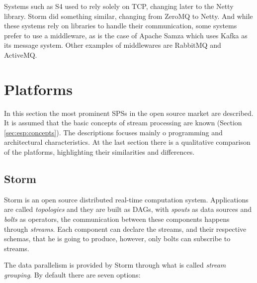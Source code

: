\documentclass[ppgc,diss,english]{iiufrgs}
\begin{document}
Systems such as S4 used to rely solely on TCP, changing later to the Netty library. Storm did something similar, changing from ZeroMQ to Netty. And while these systems rely on libraries to handle their communication, some systems prefer to use a middleware, as is the case of Apache Samza which uses Kafka as its message system. Other examples of middlewares are RabbitMQ and ActiveMQ.


\section{Platforms}
\label{sec:esp:platforms}

In this section the most prominent SPSs in the open source market are described. It is assumed that the basic concepts of stream processing are known (Section \ref{sec:esp:concepts}). The descriptions focuses mainly o programming and architectural characteristics. At the last section there is a qualitative comparison of the platforms, highlighting their similarities and differences.

\subsection{Storm}

Storm is an open source distributed real-time computation system. Applications are called \emph{topologies} and they are built as DAGs, with \emph{spouts} as data sources and \emph{bolts} as operators, the communication between these components happens through \emph{streams}. Each component can declare the streams, and their respective schemas, that he is going to produce, however, only bolts can subscribe to streams.

The data parallelism is provided by Storm through what is called \emph{stream grouping}. By default there are seven options:
\end{document}
